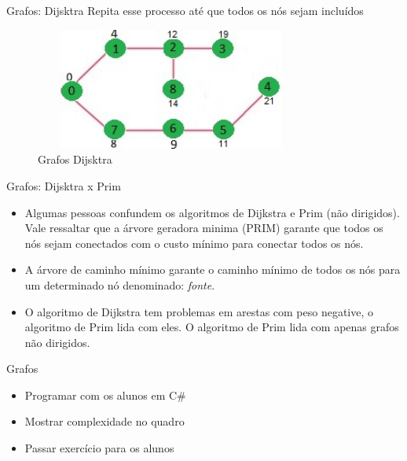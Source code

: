 \begin{frame}
	\begin{block}{Grafos: Dijsktra}
		Repita esse processo até que todos os nós sejam incluídos
		\begin{figure}[!htb]
			\centering	  
			\includegraphics[height=4cm, width = 9cm]{./pic/DIJ5.jpg}
			\caption{Grafos Dijsktra \cite{GEEKS_2018}}
		\end{figure}
	\end{block}
\end{frame}

\begin{frame}
	\begin{block}{Grafos: Dijsktra x Prim}
		\begin{itemize}
			\item Algumas pessoas confundem os algoritmos de Dijkstra e Prim (não dirigidos). Vale ressaltar que a árvore geradora minima (PRIM) garante que todos os nós sejam conectados com o custo mínimo para conectar todos os nós.
			\item A árvore de caminho mínimo garante o caminho mínimo de todos os nós para um determinado nó denominado: \emph{fonte}.
			\item O algoritmo de Dijkstra tem problemas em arestas com peso negative, o algoritmo de Prim lida com eles. O algoritmo de Prim lida com apenas grafos não dirigidos.
		\end{itemize}
	\end{block}
\end{frame}

\begin{frame}
	\begin{block}{Grafos}
		\begin{itemize}
			\item Programar com os alunos em C\#	
			\item Mostrar complexidade no quadro	
			\item Passar exercício para os alunos
		\end{itemize}
	\end{block}
\end{frame}


